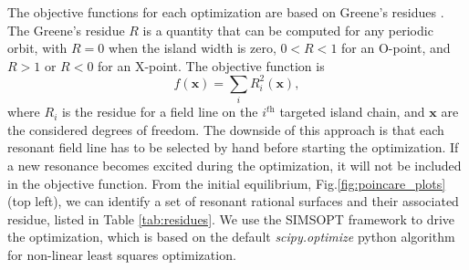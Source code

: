 The objective functions for each optimization are based on Greene's residues \citep{Greene1978}. The Greene's residue $R$ is a quantity that can be computed for any periodic orbit, with $R=0$ when the island width is zero, $0< R< 1$ for an O-point, and $R>1$ or $R<0$ for an X-point. The objective function is
\begin{equation}
    f(\mathbf{x}) = \sum_i R_{i}^2(\mathbf{x}), \label{eq:objective_function_1}
\end{equation}
where $R_{i}$ is the residue for a field line on the  $i^{\textit{th}}$ targeted island chain, and $\mathbf{x}$ are the considered degrees of freedom. The downside of this approach is that each resonant field line has to be selected by hand before starting the optimization. If a new resonance becomes excited during the optimization, it will not be included in the objective function. From the initial equilibrium, Fig.\ref{fig:poincare_plots} (top left), we can identify a set of resonant rational surfaces and their associated residue, listed in Table \ref{tab:residues}. We use the SIMSOPT framework to drive the optimization, which is based on the default \emph{scipy.optimize} \citep{Virtanen2020} python algorithm for non-linear least squares optimization.
